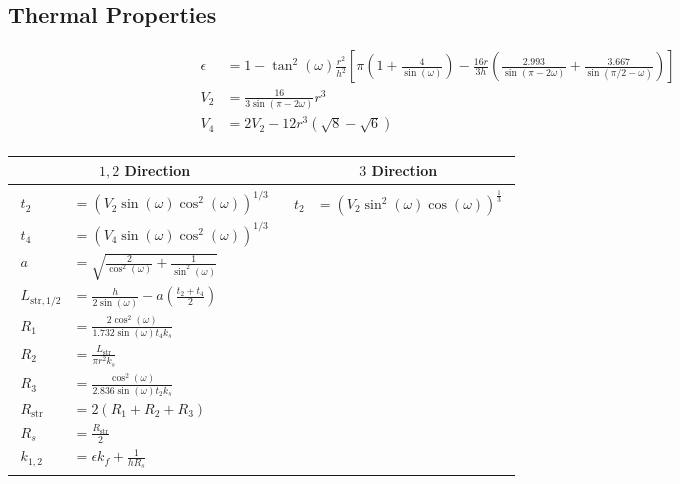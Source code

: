 \subsection*{Thermal Properties}
\begin{equation*}
    \begin{split}
        \epsilon &= 1 - \tan^2(\omega)\frac{r^2}{h^2}\left[\pi\left(1+\frac{4}{\sin(\omega)}\right)- \frac{16r}{3h}\left(\frac{2.993}{\sin(\pi-2\omega)}+\frac{3.667}{\sin(\pi/2-\omega)}\right)\right] \\
        V_2 &= \frac{16}{3\sin(\pi-2\omega)}r^3 \\
        V_4 &= 2V_2 - 12r^3\left(\sqrt8-\sqrt6\right) \\
    \end{split}
\end{equation*}
\begin{table}[ht]
    \centering
    \begin{tabular}{c | c}
        $1,2$ Direction & $3$ Direction \\ \hline
        \parbox{0.49\linewidth}{
        \begin{equation*}
            \begin{split}
                t_2 &= (V_2\sin(\omega)\cos^2(\omega))^{1/3} \\
                t_4 &= (V_4\sin(\omega)\cos^2(\omega))^{1/3} \\
                a &= \sqrt{\frac{2}{\cos^2(\omega)}+\frac{1}{\sin^2(\omega)}} \\
                L_{\text{str},1/2} &= \frac{h}{2\sin(\omega)} -a\left(\frac{t_2+t_4}{2}\right) \\
                R_1 &= \frac{2\cos^2(\omega)}{1.732\sin(\omega)t_4k_s} \\
                R_2 &= \frac{L_\text{str}}{\pi r^2k_s} \\
                R_3 &= \frac{\cos^2(\omega)}{2.836\sin(\omega)t_2k_s} \\
                R_\text{str} &= 2(R_1 + R_2 + R_3) \\
                R_s &= \frac{R_\text{str}}{2} \\
                k_{1,2} &= \epsilon k_f + \frac{1}{hR_s}
            \end{split}
        \end{equation*} 
        }
        & 
        \parbox{0.49\linewidth}{
        \begin{equation*}
            \begin{split}
                t_2 &= (V_2\sin^2(\omega)\cos(\omega))^\frac{1}{3} \\

\end{split}
\end{equation*}}
\end{tabular}
\end{table}
